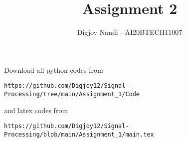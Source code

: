 \documentclass[journal,12pt,twocolumn]{IEEEtran}
\DeclareMathOperator*{\Res}{Res}
\begin{document}
\newcommand{\BEQA}{\begin{eqnarray}}
\newcommand{\EEQA}{\end{eqnarray}}
\newcommand{\define}{\stackrel{\triangle}{=}}

\raggedbottom
\setlength{\parindent}{0pt}
\providecommand{\mbf}{\mathbf}
\providecommand{\pr}[1]{\ensuremath{\Pr\left(#1\right)}}
\providecommand{\qfunc}[1]{\ensuremath{Q\left(#1\right)}}
\providecommand{\sbrak}[1]{\ensuremath{{}\left[#1\right]}}
\providecommand{\lsbrak}[1]{\ensuremath{{}\left[#1\right.}}
\providecommand{\rsbrak}[1]{\ensuremath{{}\left.#1\right]}}
\providecommand{\brak}[1]{\ensuremath{\left(#1\right)}}
\providecommand{\lbrak}[1]{\ensuremath{\left(#1\right.}}
\providecommand{\rbrak}[1]{\ensuremath{\left.#1\right)}}
\providecommand{\cbrak}[1]{\ensuremath{\left\{#1\right\}}}
\providecommand{\lcbrak}[1]{\ensuremath{\left\{#1\right.}}
\providecommand{\rcbrak}[1]{\ensuremath{\left.#1\right\}}}
\theoremstyle{remark}
\newtheorem{rem}{Remark}
\newcommand{\sgn}{\mathop{\mathrm{sgn}}}
\providecommand{\abs}[1]{\vert#1\vert}
\providecommand{\res}[1]{\Res\displaylimits_{#1}} 
\providecommand{\norm}[1]{\lVert#1\rVert}
\providecommand{\mtx}[1]{\mathbf{#1}}
\providecommand{\mean}[1]{E[ #1 ]}
\providecommand{\fourier}{\overset{\mathcal{F}}{ \rightleftharpoons}}
\providecommand{\system}{\overset{\mathcal{H}}{ \longleftrightarrow}}
\newcommand{\solution}{\noindent \textbf{Solution: }}
\newcommand{\cosec}{\,\text{cosec}\,}
\providecommand{\dec}[2]{\ensuremath{\overset{#1}{\underset{#2}{\gtrless}}}}
\newcommand{\myvec}[1]{\ensuremath{\begin{pmatrix}#1\end{pmatrix}}}
\newcommand{\mydet}[1]{\ensuremath{\begin{vmatrix}#1\end{vmatrix}}}
\makeatletter
{}
\makeatother
\let\StandardTheFigure\thefigure
\let\vec\mathbf
\renewcommand{\thefigure}{\theproblem}
\def\putbox#1#2#3{\makebox[0in][l]{\makebox[#1][l]{}\raisebox{\baselineskip}[0in][0in]{\raisebox{#2}[0in][0in]{#3}}}}
     \def\rightbox#1{\makebox[0in][r]{#1}}
     \def\centbox#1{\makebox[0in]{#1}}
     \def\topbox#1{\raisebox{-\baselineskip}[0in][0in]{#1}}
     \def\midbox#1{\raisebox{-0.5\baselineskip}[0in][0in]{#1}}
\vspace{3cm}
\title{Assignment 2}
\author{Digjoy Nandi - AI20BTECH11007}
\maketitle
\newpage
\bigskip
\renewcommand{\thefigure}{\theenumi}
\renewcommand{\thetable}{\theenumi}
Download all python codes from 
\begin{lstlisting}
https://github.com/Digjoy12/Signal-Processing/tree/main/Assignment_1/Code
\end{lstlisting}
%
and latex codes from 
%
\begin{lstlisting}
https://github.com/Digjoy12/Signal-Processing/blob/main/Assignment_1/main.tex
\end{lstlisting}
\end{document}
